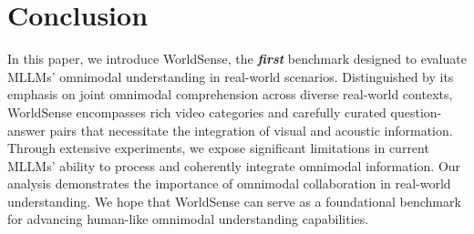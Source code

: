 \section{Conclusion}
In this paper, we introduce WorldSense, the \textbf{\textit{first}} benchmark designed to evaluate MLLMs' omnimodal understanding in real-world scenarios. Distinguished by its emphasis on joint omnimodal comprehension across diverse real-world contexts, WorldSense encompasses rich video categories and carefully curated question-answer pairs that necessitate the integration of visual and acoustic information. Through extensive experiments, we expose significant limitations in current MLLMs' ability to process and coherently integrate omnimodal information. Our analysis demonstrates the importance of omnimodal collaboration in real-world understanding. We hope that WorldSense can serve as a foundational benchmark for advancing human-like omnimodal understanding capabilities.

